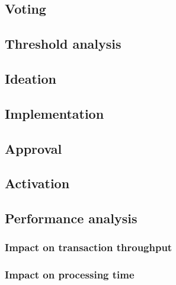 \documentclass[11pt,a4paper]{article}
\begin{document}
\subsection{Voting}
\label{sec:voting}


\subsection{Threshold analysis}
\label{sec:threshold-analysis}

\subsection{Ideation}
\label{sec:ideation}

\subsection{Implementation}
\label{sec:implementation}

\subsection{Approval}
\label{sec:approval}

\subsection{Activation}
\label{sec:activation}


\subsection{Performance analysis}
\label{sec:performance-analysis}

\subsubsection{Impact on transaction throughput}
\label{sec:impact-trans-thro}

\subsubsection{Impact on processing time}
\label{sec:impact-proc-time}
\end{document}
